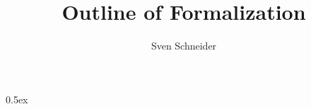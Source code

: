\documentclass[10pt,a4paper]{scrbook}
\begin{document}
\title{Outline of Formalization}
\author{Sven Schneider}
\maketitle

\tableofcontents

\parindent 0pt\parskip 0.5ex






%
%
\end{document}
